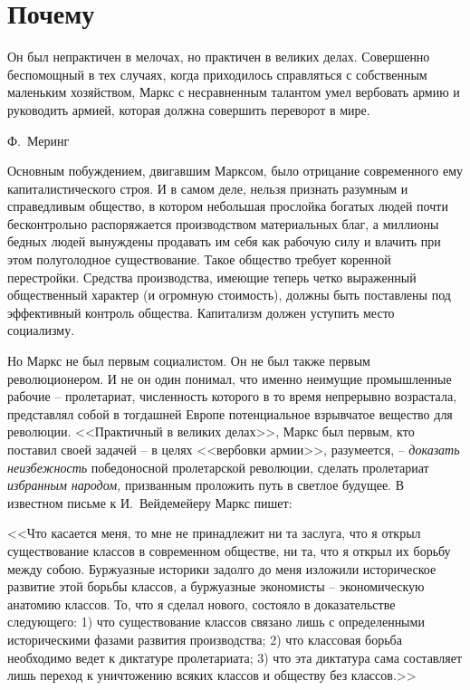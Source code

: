 \documentclass{book}
\begin{document}
\section{Почему}
\epigraph{Он был непрактичен в мелочах, но практичен в великих делах. Совершенно беспомощный в тех случаях, когда приходилось 
справляться с собственным маленьким хозяйством, Маркс с несравненным талантом умел вербовать армию и руководить армией, которая 
должна совершить переворот в мире.}{Ф.~Меринг%
}

Основным побуждением, двигавшим Марксом, было отрица­ние современного ему капиталистического строя. И в самом деле, нельзя 
признать разумным и справедливым общество, в котором небольшая прослойка богатых людей почти бесконтроль­но распоряжается 
производством материальных благ, а миллионы бедных людей вынуждены продавать им себя как рабочую силу и влачить при этом 
полуголодное существование. Такое общество требует коренной перестройки. Средства производства, имеющие теперь четко выраженный 
общественный характер (и огромную стоимость), должны быть поставлены под эффективный контроль общества. Капитализм должен 
уступить место социализму.

Но Маркс не был первым социалистом. Он не был также первым революционером. И не он один понимал, что именно неимущие 
промышленные рабочие -- пролетариат, численность которо­го в то время непрерывно возрастала, представлял собой в тог­дашней Европе 
потенциальное взрывчатое вещество для революции. <<Практичный в великих делах>>, Маркс был первым, кто поставил своей задачей -- 
в целях <<вербовки армии>>, разумеется, -- \textit{доказать неизбежность}  победоносной пролетарской революции, сделать 
пролетариат \textit{избранным народом,}  призванным проложить путь в светлое будущее. В известном письме к И.~Вейдемейеру%
Маркс пишет:

<<Что касается меня, то мне не принадлежит ни та заслуга, что я открыл существование классов в современном обществе, ни та, что я открыл их борьбу между собою. Буржуазные историки задолго до меня изложили историческое развитие этой борьбы классов, а 
буржуазные экономисты -- экономическую анатомию классов. То, что я сделал нового, состояло в доказательстве следующего: 1) что 
существование классов связано лишь с определенными историческими фазами развития производства; 2) что классовая борьба 
необходимо ведет к диктатуре пролета­риата; 3) что эта диктатура сама составляет лишь переход к уничтожению всяких классов и 
обществу без классов.>>
\end{document}
